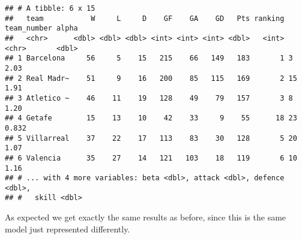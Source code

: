 \documentclass[
]{article}
\begin{document}
\begin{verbatim}
## # A tibble: 6 x 15
##   team           W     L     D    GF    GA    GD   Pts ranking team_number alpha
##   <chr>      <dbl> <dbl> <dbl> <int> <int> <int> <dbl>   <int> <chr>       <dbl>
## 1 Barcelona     56     5    15   215    66   149   183       1 3           2.03 
## 2 Real Madr~    51     9    16   200    85   115   169       2 15          1.91 
## 3 Atletico ~    46    11    19   128    49    79   157       3 8           1.20 
## 4 Getafe        15    13    10    42    33     9    55      18 23          0.832
## 5 Villarreal    37    22    17   113    83    30   128       5 20          1.07 
## 6 Valencia      35    27    14   121   103    18   119       6 10          1.16 
## # ... with 4 more variables: beta <dbl>, attack <dbl>, defence <dbl>,
## #   skill <dbl>
\end{verbatim}

As expected we get exactly the same results as before, since this is the
same model just represented differently.
\end{document}
